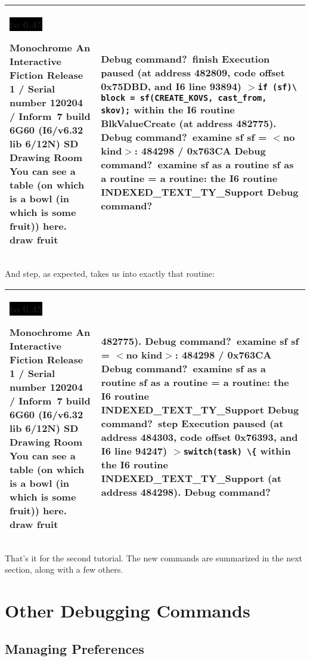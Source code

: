\documentclass{book}
\newcommand{\lastpagebreak}{\vfill\pagebreak}
\newcommand{\n}{\hspace*{\fill}\newline}
\newcommand{\terp}[2]{\begin{center}\begin{tabular}{p{0.45\textwidth}|p{0.45\textwidth}}\midrule #1&#2\\\midrule\end{tabular}\end{center}}
\newcommand{\glkheading}[1]{\textbf{#1}}
\newcommand{\glkinput}[1]{\textbf{#1}}
\newcommand{\glkstatusline}[2]{\centerline{\colorbox{black}{\hbox to 0.45\textwidth{\textcolor{white}{#1\hfil #2}}}}}
\newcommand{\storyprompt}{\raisebox{1.5pt}{\(>\)}}
\newcommand{\cursor}{\raisebox{-1.5pt}{\RectangleThin}}
\newcommand{\markedindent}{\(>\)\qquad}
\begin{document}
\terp{\glkstatusline{Drawing Room}{0/1}\n
  \glkheading{Monochrome}\n
  An Interactive Fiction\n
  Release 1 / Serial number 120204 / Inform~7 build 6G60 (I6/v6.32 lib 6/12N) SD\n
  \n
  \glkheading{Drawing Room}\n
  You can see a table (on which is a bowl (in which is some fruit)) here.\n
  \n
  \storyprompt\glkinput{draw fruit}}{%
  \n
  Debug command?\ \glkinput{finish}\n
  \n
  Execution paused (at address 482809, code offset 0x75DBD, and I6 line 93894)\n
  \markedindent \lstinline{if (sf)}\lstinline{\ block = sf(CREATE_KOVS, cast_from, skov);}\n
  within the I6 routine BlkValueCreate (at address 482775).\n
  \n
  Debug command?\ \glkinput{examine sf}\n
  \n
  sf = \(<\)no kind\(>\): 484298 / 0x763CA\n
  \n
  Debug command?\ \glkinput{examine sf as a routine}\n
  \n
  sf as a routine = a routine: the I6 routine INDEXED\_TEXT\_TY\_Support\n
  \n
  Debug command?\ \cursor}

And step, as expected, takes us into exactly that routine:

\terp{\glkstatusline{Drawing Room}{0/1}\n
  \glkheading{Monochrome}\n
  An Interactive Fiction\n
  Release 1 / Serial number 120204 / Inform~7 build 6G60 (I6/v6.32 lib 6/12N) SD\n
  \n
  \glkheading{Drawing Room}\n
  You can see a table (on which is a bowl (in which is some fruit)) here.\n
  \n
  \storyprompt\glkinput{draw fruit}}{%
  482775).\n
  \n
  Debug command?\ \glkinput{examine sf}\n
  \n
  sf = \(<\)no kind\(>\): 484298 / 0x763CA\n
  \n
  Debug command?\ \glkinput{examine sf as a routine}\n
  \n
  sf as a routine = a routine: the I6 routine INDEXED\_TEXT\_TY\_Support\n
  \n
  Debug command?\ \glkinput{step}\n
  \n
  Execution paused (at address 484303, code offset 0x76393, and I6 line 94247)\n
  \markedindent \lstinline @switch(task) \{@\n
  within the I6 routine INDEXED\_TEXT\_TY\_Support (at address 484298).\n
  \n
  Debug command?\ \cursor}

That's it for the second tutorial.  The new commands are summarized in the next
section, along with a few others.

\lastpagebreak

\section{Other Debugging Commands}
\label{other}

\subsection{Managing Preferences}
\end{document}
